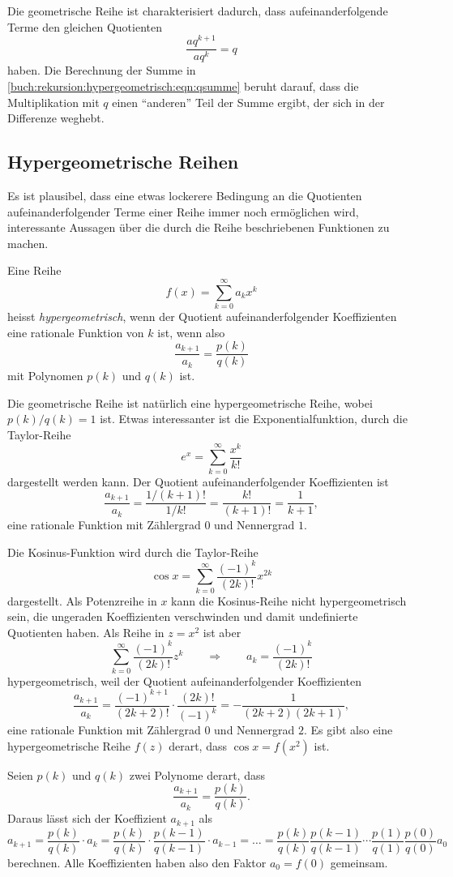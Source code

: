 Die geometrische Reihe ist charakterisiert dadurch, dass aufeinanderfolgende
Terme den gleichen Quotienten
\[
\frac{aq^{k+1}}{aq^k}
=
q
\]
haben.
Die Berechnung der Summe in 
\eqref{buch:rekursion:hypergeometrisch:eqn:qsumme}
beruht darauf, dass die Multiplikation mit $q$ einen ``anderen''
Teil der Summe ergibt, der sich in der Differenze weghebt.

\subsection{Hypergeometrische Reihen
\label{buch:rekursion:hypergeometrisch:reihen}}
Es ist plausibel, dass eine etwas lockerere Bedingung an die
Quotienten aufeinanderfolgender Terme einer Reihe immer noch
ermöglichen wird, interessante Aussagen über die durch die
Reihe beschriebenen Funktionen zu machen.

\begin{definition}
Eine Reihe
\[
f(x) = \sum_{k=0}^\infty a_k x^k
\]
heisst {\em hypergeometrisch}, wenn der Quotient aufeinanderfolgender
Koeffizienten eine rationale Funktion von $k$ ist,
wenn also
\[
\frac{a_{k+1}}{a_k}
=
\frac{p(k)}{q(k)}
\]
mit Polynomen $p(k)$ und $q(k)$ ist.
\end{definition}

Die geometrische Reihe ist natürlich eine hypergeometrische Reihe,
wobei $p(k)/q(k)=1$ ist.
Etwas interessanter ist die Exponentialfunktion, durch die Taylor-Reihe
\[
e^x = \sum_{k=0}^\infty \frac{x^k}{k!}
\]
dargestellt werden kann.
Der Quotient aufeinanderfolgender Koeffizienten ist
\[
\frac{a_{k+1}}{a_k}
=
\frac{1/(k+1)!}{1/k!}
=
\frac{k!}{(k+1)!}
=
\frac{1}{k+1},
\]
eine rationale Funktion mit Zählergrad $0$ und Nennergrad $1$.

Die Kosinus-Funktion wird durch die Taylor-Reihe
\[
\cos x = \sum_{k=0}^\infty \frac{(-1)^k}{(2k)!} x^{2k}
\]
dargestellt.
Als Potenzreihe in $x$ kann die Kosinus-Reihe nicht hypergeometrisch sein,
die ungeraden Koeffizienten verschwinden und damit undefinierte
Quotienten haben.
Als Reihe in $z=x^2$ ist aber
\[
\sum_{k=0}^\infty \frac{(-1)^k}{(2k)!} z^k
\qquad\Rightarrow\qquad
a_k = \frac{(-1)^k}{(2k)!}
\]
hypergeometrisch, weil der Quotient aufeinanderfolgender Koeffizienten
\[
\frac{a_{k+1}}{a_k}
=
\frac{(-1)^{k+1}}{(2k+2)!}\cdot \frac{(2k)!}{(-1)^k}
=
-\frac{1}{(2k+2)(2k+1)},
\]
eine rationale Funktion mit Zählergrad $0$ und Nennergrad $2$.
Es gibt also eine hypergeometrische Reihe $f(z)$ derart, dass
$\cos x = f(x^2)$ ist.

Seien $p(k)$ und $q(k)$ zwei Polynome derart, dass
\[
\frac{a_{k+1}}{a_k} = \frac{p(k)}{q(k)}.
\]
Daraus lässt sich der Koeffizient $a_{k+1}$ als
\begin{equation}
a_{k+1}
=
\frac{p(k)}{q(k)}
\cdot
a_k
=
\frac{p(k)}{q(k)}
\cdot
\frac{p(k-1)}{q(k-1)}
\cdot
a_{k-1}
=\dots=
\frac{p(k)}{q(k)}
\frac{p(k-1)}{q(k-1)}
\cdots
\frac{p(1)}{q(1)}
\frac{p(0)}{q(0)}
a_0
\label{buch:rekursion:hypergeometrisch:ak+1}
\end{equation}
berechnen.
Alle Koeffizienten haben also den Faktor $a_0=f(0)$ gemeinsam.

